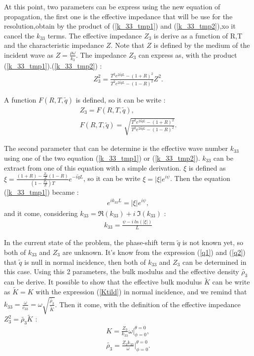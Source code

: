 \documentclass{article}
\begin{document}
    At this point, two parameters can be express using the new equation of propagation, the first one  is the effective impedance that will be use for the resolution,obtain by the product of (\ref{k_33_tmp1}) and (\ref{k_33_tmp2}),xo it cancel the $k_{33}$ terms. The effective impedance $Z_3$ is derive as a function of R,T and the characteristic impedance $Z$. Note that $Z$ is defined by the medium of the incident wave as $Z=\frac{\rho \omega}{k_3}$.
    The impedance $Z_3$ can express as, with the product (\ref{k_33_tmp1}).(\ref{k_33_tmp2}) :
    \begin{align}
    Z_3^2=\frac{T^2e^{2i\tilde{q}L}-(1+R)^2}{T^2e^{2i\tilde{q}L}-(1-R)^2}Z^2\label{Z3}.
    \end{align}
    
    A function $F(R,T,\tilde{q})$ is defined, so it can be write :
    \begin{align}
        Z_3=F(R,T,\tilde{q}),\\
        F(R,T,\tilde{q})=\sqrt{\frac{T^2e^{2i\tilde{q}L}-(1+R)^2}{T^2e^{2i\tilde{q}L}-(1-R)^2}}.
    \end{align}
    
    The second parameter that can be determine is the effective wave number $k_{33}$ using one of the two equation (\ref{k_33_tmp1}) or (\ref{k_33_tmp2}).
    $k_{33}$ can be extract from one of this equation with a simple derivation. $\xi$ is defined as $\xi=\frac{(1+R)-\frac{Z_3}{Z}(1-R)}{(1-\frac{Z_3}{Z})T}e^{-i\tilde{q}L}$, so it can be write $\xi=|\xi|e^{i\psi}$. Then the equation (\ref{k_33_tmp1}) became :
    \begin{align}
	e^{i k_{33}L}=|\xi|e^{i\psi},
    \end{align}
    and it come, considering $k_{33}=\Re(k_{33})+i\ \Im(k_{33})$ :
    \begin{align}
        k_{33}=\frac{\psi-i\ ln(|\xi|)}{L}
    \end{align}
    
    In the current state of the problem, the phase-shift term $\tilde{q}$ is not known yet, so both of $k_{33}$ and $Z_3$ are unknown. It's know from the expression (\ref{q1}) and (\ref{q2}) that $\tilde{q}$ is null in normal incidence, then both of $k_{33}$ and $Z_3$ can be determined in this case. 
    Using this 2 parameters, the bulk modulus and the effective density $\tilde{\rho_3}$ can be derive. It possible to show that the effective bulk modulus $\tilde{K}$ can be write as $\tilde{K}=K$ with the expression (\ref{Ktild}) in normal incidence, and we remind that $k_{33}=\frac{\omega}{c_{33}}=\omega\sqrt{\frac{\tilde{\rho_3}}{\tilde{K}}}$. Then it come, with the definition of the effective impedance $Z_3^2=\tilde{\rho_3}\tilde{K}$ :
    \begin{align}
        K=\frac{Z_3}{k_{33}}\omega|^{\theta=0}_{\phi=0},\\
        \tilde{\rho_3}=\frac{Z_3k_{33}}{\omega}|^{\theta=0}_{\phi=0}.
    \end{align}
    
\end{document}
